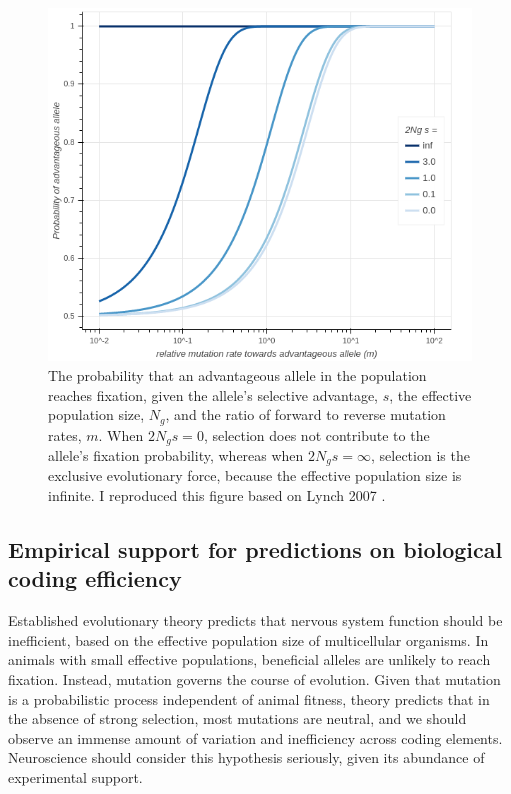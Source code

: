 \documentclass{article}
\begin{document}
\begin{figure}[htp]
\centering
\includegraphics[width=10 cm]{fig_1.png}
\caption{The probability that an advantageous allele in the population reaches fixation, given the allele's selective advantage, $s$, the effective population size, $N_g$, and the ratio of forward to reverse mutation rates, $m$. When $2N_gs=0$, selection does not contribute to the allele's fixation probability, whereas when $2N_gs=\infty$, selection is the exclusive evolutionary force, because the effective population size is infinite. I reproduced this figure based on Lynch 2007 \cite{Lynch_2007}.}
\end{figure}

\subsection{Empirical support for predictions on biological coding efficiency}

Established evolutionary theory predicts that nervous system function should be inefficient, based on the effective population size of multicellular organisms. In animals with small effective populations, beneficial alleles are unlikely to reach fixation. Instead, mutation governs the course of evolution. Given that mutation is a probabilistic process independent of animal fitness, theory predicts that in the absence of strong selection, most mutations are neutral, and we should observe an immense amount of variation and inefficiency across coding elements. Neuroscience should consider this hypothesis seriously, given its abundance of experimental support. 
\end{document}
